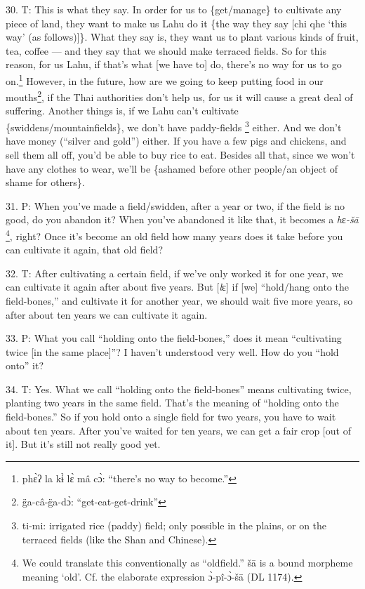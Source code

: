 30. T: This is what they say. In order for us to \{get/manage\} to cultivate any
piece of land, they want to make us Lahu do it \{the way they say [chi qhe `this
way' (as follows)]\}. What they say is, they want us to plant various kinds of
fruit, tea, coffee --- and they say that we should make terraced fields. So for
this reason, for us Lahu, if that's what [we have to] do, there's no way for us
to go on.\footnote{phɛ̀ʔ la kɨ̀ lɛ̀ mâ cɔ̀: ``there's no way to become.''} However, in the future, how are we going to keep putting food in
our mouths\footnote{g̈a-câ-g̈a-dɔ̀: ``get-eat-get-drink''}, if the Thai authorities don't help us, for us it will cause a great
deal of suffering. Another things is, if we Lahu can't cultivate \{swiddens/mountainfields\},
we don't have paddy-fields \footnote{ti-mi: irrigated rice (paddy) field; only possible in the plains, or on the terraced fields (like the Shan and Chinese).} either. And we don't have money (``silver and gold'')
either. If you have a few pigs and chickens, and sell them all off, you'd be able
to buy rice to eat. Besides all that, since we won't have any clothes to wear,
we'll be \{ashamed before other people/an object of shame for others\}.

31. P: When you've made a field/swidden, after a year or two, if the field is no
good, do you abandon it? When you've abandoned it like that, it becomes a \textit{h}ɛ\textit{-šā
}\footnote{We could translate this conventionally as ``oldfield.'' šā is a bound morpheme meaning `old'. Cf. the elaborate expression ɔ̀-pî-ɔ̀-šā (DL 1174).}, right? Once it's become an old field how many years does it take before
you can cultivate it again, that old field?

32. T: After cultivating a certain field, if we've only worked it for one year,
we can cultivate it again after about five years. But [\textit{l}ɛ] if [we] ``hold/hang
onto the field-bones,'' and cultivate it for another year, we should wait five
more years, so after about ten years we can cultivate it again.

33. P: What you call ``holding onto the field-bones,'' does it mean ``cultivating
twice [in the same place]''? I haven't understood very well. How do you ``hold
onto'' it?

34. T: Yes. What we call ``holding onto the field-bones'' means cultivating twice,
planting two years in the same field. That's the meaning of ``holding onto the
field-bones.'' So if you hold onto a single field for two years, you have to wait
about ten years. After you've waited for ten years, we can get a fair crop [out
of it]. But it's still not really good yet.


